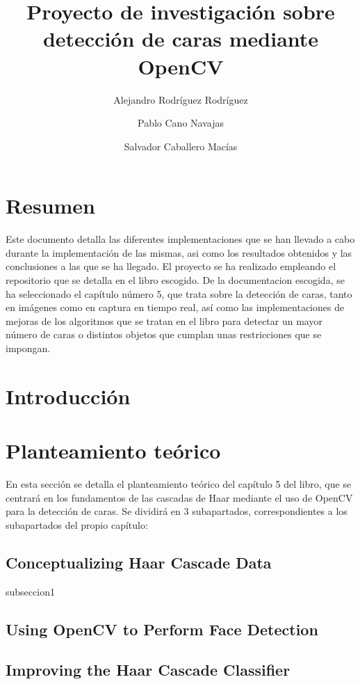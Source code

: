 \documentclass[a4paper]{article}
\title{Proyecto de investigación sobre detección de caras mediante OpenCV}
\author{Alejandro Rodríguez Rodríguez \and Pablo Cano Navajas \and Salvador Caballero Macías}
\begin{document}
\maketitle

\newpage
\tableofcontents

\newpage
\section*{Resumen}

Este documento detalla las diferentes implementaciones que se han llevado a cabo durante la implementación de las mismas, asi como los resultados obtenidos y las conclusiones a las que se ha llegado. El proyecto se ha realizado empleando el repositorio\cite{1} que se detalla en el libro escogido\cite{2}.
De la documentacion escogida, se ha seleccionado el capítulo número 5, que trata sobre la detección de caras, tanto en imágenes como en captura en tiempo real, así como las implementaciones de mejoras de los algoritmos que se tratan en el libro para detectar un mayor número de caras o distintos objetos que cumplan unas restricciones que se impongan.

\section{Introducción}

\section{Planteamiento teórico}

En esta sección se detalla el planteamiento teórico del capítulo 5 del libro\cite{2}, que se centrará en los fundamentos de las cascadas de Haar mediante el uso de OpenCV para la detección de caras. Se dividirá en 3 subapartados, correspondientes a los subapartados del propio capítulo:

\subsection{Conceptualizing Haar Cascade Data}

subseccion1

\subsection{Using OpenCV to Perform Face Detection}

\subsection{Improving the Haar Cascade Classifier}
\end{document}
